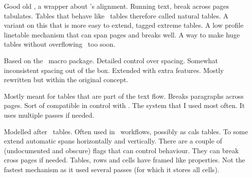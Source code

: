 
\definecolor[maincolor][r=.4,b=.4]

\startdocument[title=Tables,subtitle={\CONTEXT\ 2017 Maibach}]

\startchapter[title=Variants]

\startitemize
    \startitem
        Good old \TABLE, a wrapper about \TEX's alignment.
    \stopitem
    \startitem
        Running text, break across pages tabulates.
    \stopitem
    \startitem
        Tables that behave like \HTML\ tables therefore called
        natural tables.
    \stopitem
    \startitem
        A variant on this that is more easy to extend, tagged
        extreme tables.
    \stopitem
    \startitem
        A low profile linetable mechanism that can span pages
        and breaks well.
    \stopitem
    \startitem
        A way to make huge tables without overflowing \TEX\ too
        soon.
    \stopitem
\stopitemize

\stopchapter

\startchapter[title=\TABLE]

\startitemize
    \startitem
        Based on the \TABLE\ macro package.
    \stopitem
    \startitem
        Detailed control over spacing.
    \stopitem
    \startitem
        Somewhat inconsistent spacing out of the box.
    \stopitem
    \startitem
        Extended with extra features.
    \stopitem
    \startitem
        Mostly rewritten but within the original concept.
    \stopitem
\stopitemize

\stopchapter

\startchapter[title=Tabulate]

\startitemize
    \startitem
        Mostly meant for tables that are part of the text flow.
    \stopitem
    \startitem
        Breaks paragraphs across pages.
    \stopitem
    \startitem
        Sort of compatible in control with \TABLE.
    \stopitem
    \startitem
        The system that I used most often.
    \stopitem
    \startitem
        It uses multiple passes if needed.
    \stopitem
\stopitemize

\stopchapter

\startchapter[title=Natural tables]

\startitemize
    \startitem
        Modelled after \HTML\ tables.
    \stopitem
    \startitem
        Often used in \XML\ workflows, possibly as cals tables.
    \stopitem
    \startitem
        To some extend automatic spans horizontally and vertically.
    \stopitem
    \startitem
        There are a couple of (undocumented and obscure) flags that can control
        behaviour.
    \stopitem
    \startitem
        They can break cross pages if needed.
    \stopitem
    \startitem
        Tables, rows and cells have framed like properties.
    \stopitem
    \startitem
        Not the fastest mechanism as it used several passes (for which it
        stores all cells).
    \stopitem
\stopitemize

